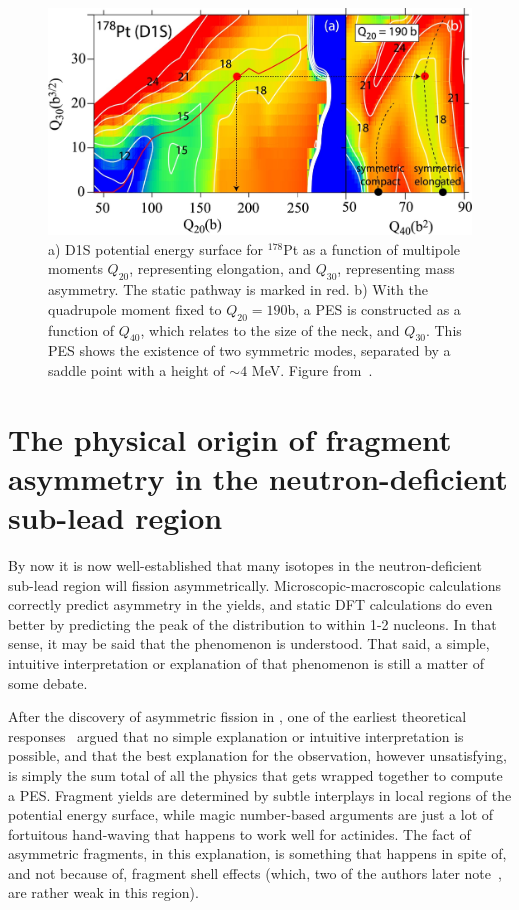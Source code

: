 \begin{figure}
	\centering
	\includegraphics[width=0.7\linewidth]{TeX_files/178Pt_D1S_pes.jpg}
	\caption{a) D1S potential energy surface for $^{178}$Pt as a function of multipole moments $Q_{20}$, representing elongation, and $Q_{30}$, representing mass asymmetry. The static pathway is marked in red. b) With the quadrupole moment fixed to $Q_{20}=190$b, a PES is constructed as a function of $Q_{40}$, which relates to the size of the neck, and $Q_{30}$. This PES shows the existence of two symmetric modes, separated by a saddle point with a height of ${\sim}4$ MeV. Figure from~\cite{Tsekhanovich2019}.}
	\label{fig:178ptd1spes}
\end{figure}



\section{The physical origin of fragment asymmetry in the neutron-deficient sub-lead region}

By now it is now well-established that many isotopes in the neutron-deficient sub-lead region will fission asymmetrically. Microscopic-macroscopic calculations correctly predict asymmetry in the yields, and static DFT calculations do even better by predicting the peak of the distribution to within 1-2 nucleons. In that sense, it may be said that the phenomenon is understood. That said, a simple, intuitive interpretation or explanation of that phenomenon is still a matter of some debate.

After the discovery of asymmetric fission in {\Hg}, one of the earliest theoretical responses~\cite{Moller2012} argued that no simple explanation or intuitive interpretation is possible, and that the best explanation for the observation, however unsatisfying, is simply the sum total of all the physics that gets wrapped together to compute a PES. Fragment yields are determined by subtle interplays in local regions of the potential energy surface, while magic number-based arguments are just a lot of fortuitous hand-waving that happens to work well for actinides. The fact of asymmetric fragments, in this explanation, is something that happens in spite of, and not because of, fragment shell effects (which, two of the authors later note~\cite{Ichikawa2012}, are rather weak in this region).

